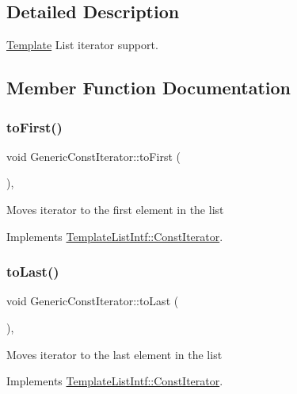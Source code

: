 \subsection{Detailed Description}
\mbox{\hyperlink{class_template}{Template}} List iterator support. 

\subsection{Member Function Documentation}
\mbox{\label{class_generic_const_iterator_abb4c60f119f4ad23523b96080cfabd3e}} 
\subsubsection{\texorpdfstring{toFirst()}{toFirst()}}
{\footnotesize\ttfamily void Generic\+Const\+Iterator\+::to\+First (\begin{DoxyParamCaption}{ }\end{DoxyParamCaption})\hspace{0.3cm}{\ttfamily [inline]}, {\ttfamily [virtual]}}

Moves iterator to the first element in the list 

Implements \mbox{\hyperlink{class_template_list_intf_1_1_const_iterator_ab0d366c70210b05cf32f465d953d3152}{Template\+List\+Intf\+::\+Const\+Iterator}}.

\mbox{\label{class_generic_const_iterator_a53787d6c70cff35f1edb8b3ced0530aa}} 
\subsubsection{\texorpdfstring{toLast()}{toLast()}}
{\footnotesize\ttfamily void Generic\+Const\+Iterator\+::to\+Last (\begin{DoxyParamCaption}{ }\end{DoxyParamCaption})\hspace{0.3cm}{\ttfamily [inline]}, {\ttfamily [virtual]}}

Moves iterator to the last element in the list 

Implements \mbox{\hyperlink{class_template_list_intf_1_1_const_iterator_acf5b37615cb4544e1b0cb5717a127900}{Template\+List\+Intf\+::\+Const\+Iterator}}.

